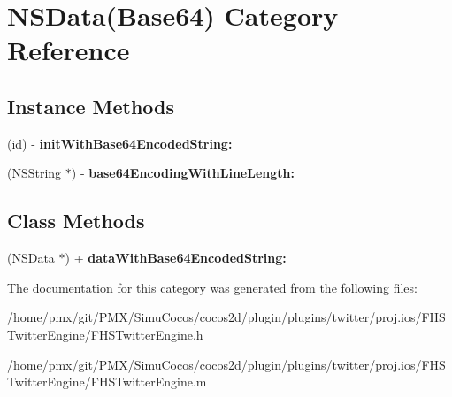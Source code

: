 \hypertarget{categoryNSData_07Base64_08}{}\section{N\+S\+Data(Base64) Category Reference}
\label{categoryNSData_07Base64_08}
\subsection*{Instance Methods}
\begin{DoxyCompactItemize}
\item 
\mbox{\label{categoryNSData_07Base64_08_a8ae1199482c6ba5de2054dd5eb9705c1}} 
(id) -\/ {\bfseries init\+With\+Base64\+Encoded\+String\+:}
\item 
\mbox{\label{categoryNSData_07Base64_08_afb5591b61293b5aca86130d46866a467}} 
(N\+S\+String $\ast$) -\/ {\bfseries base64\+Encoding\+With\+Line\+Length\+:}
\end{DoxyCompactItemize}
\subsection*{Class Methods}
\begin{DoxyCompactItemize}
\item 
\mbox{\label{categoryNSData_07Base64_08_ab966df11258c0dbd764f0954c58825dc}} 
(N\+S\+Data $\ast$) + {\bfseries data\+With\+Base64\+Encoded\+String\+:}
\end{DoxyCompactItemize}


The documentation for this category was generated from the following files\+:\begin{DoxyCompactItemize}
\item 
/home/pmx/git/\+P\+M\+X/\+Simu\+Cocos/cocos2d/plugin/plugins/twitter/proj.\+ios/\+F\+H\+S\+Twitter\+Engine/F\+H\+S\+Twitter\+Engine.\+h\item 
/home/pmx/git/\+P\+M\+X/\+Simu\+Cocos/cocos2d/plugin/plugins/twitter/proj.\+ios/\+F\+H\+S\+Twitter\+Engine/F\+H\+S\+Twitter\+Engine.\+m\end{DoxyCompactItemize}
